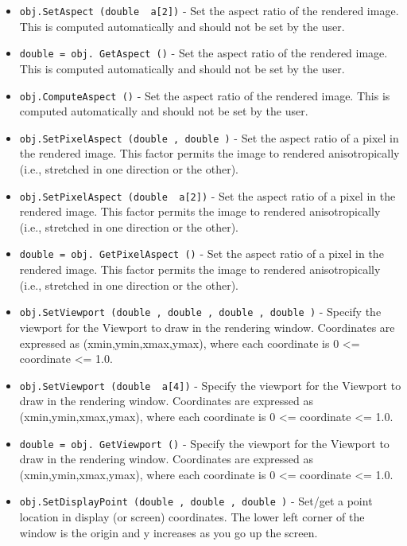 \begin{itemize}
\item  \verb|obj.SetAspect (double  a[2])| -  Set the aspect ratio of the rendered image. This is computed
 automatically and should not be set by the user.

\item  \verb|double = obj. GetAspect ()| -  Set the aspect ratio of the rendered image. This is computed
 automatically and should not be set by the user.

\item  \verb|obj.ComputeAspect ()| -  Set the aspect ratio of the rendered image. This is computed
 automatically and should not be set by the user.

\item  \verb|obj.SetPixelAspect (double , double )| -  Set the aspect ratio of a pixel in the rendered image.
 This factor permits the image to rendered anisotropically
 (i.e., stretched in one direction or the other).

\item  \verb|obj.SetPixelAspect (double  a[2])| -  Set the aspect ratio of a pixel in the rendered image.
 This factor permits the image to rendered anisotropically
 (i.e., stretched in one direction or the other).

\item  \verb|double = obj. GetPixelAspect ()| -  Set the aspect ratio of a pixel in the rendered image.
 This factor permits the image to rendered anisotropically
 (i.e., stretched in one direction or the other).

\item  \verb|obj.SetViewport (double , double , double , double )| -  Specify the viewport for the Viewport to draw in the rendering window.
 Coordinates are expressed as (xmin,ymin,xmax,ymax), where each
 coordinate is 0 <= coordinate <= 1.0.

\item  \verb|obj.SetViewport (double  a[4])| -  Specify the viewport for the Viewport to draw in the rendering window.
 Coordinates are expressed as (xmin,ymin,xmax,ymax), where each
 coordinate is 0 <= coordinate <= 1.0.

\item  \verb|double = obj. GetViewport ()| -  Specify the viewport for the Viewport to draw in the rendering window.
 Coordinates are expressed as (xmin,ymin,xmax,ymax), where each
 coordinate is 0 <= coordinate <= 1.0.

\item  \verb|obj.SetDisplayPoint (double , double , double )| -  Set/get a point location in display (or screen) coordinates.
 The lower left corner of the window is the origin and y increases
 as you go up the screen.


\end{itemize}
